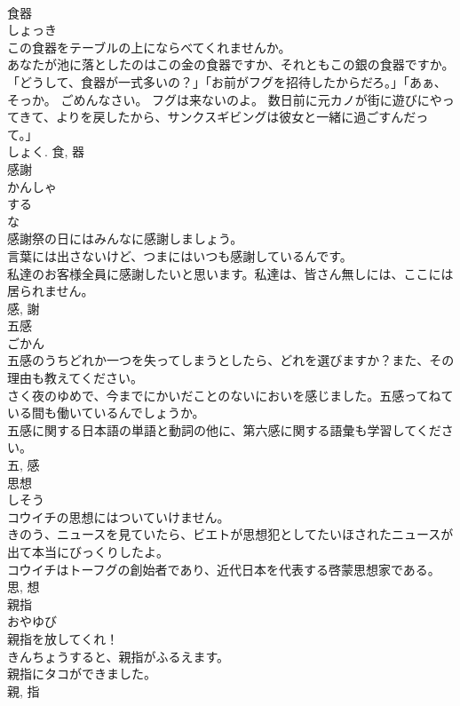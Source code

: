 \documentclass[8pt]{extreport}
\begin{document}
\begin{CJK}{UTF8}{min}
\\	食器	
\\	しょっき	
\\	この食器をテーブルの上にならべてくれませんか。	
\\	あなたが池に落としたのはこの金の食器ですか、それともこの銀の食器ですか。	
\\	「どうして、食器が一式多いの？」「お前がフグを招待したからだろ。」「あぁ、そっか。 ごめんなさい。 フグは来ないのよ。 数日前に元カノが街に遊びにやってきて、よりを戻したから、サンクスギビングは彼女と一緒に過ごすんだって。」	
\\	しょく.	食, 器	
\\	感謝	
\\	かんしゃ	
\\	する 
\\	な 
\\	感謝祭の日にはみんなに感謝しましょう。	
\\	言葉には出さないけど、つまにはいつも感謝しているんです。	
\\	私達のお客様全員に感謝したいと思います。私達は、皆さん無しには、ここには居られません。	
\\	感, 謝	
\\	五感	
\\	ごかん	
\\	五感のうちどれか一つを失ってしまうとしたら、どれを選びますか？また、その理由も教えてください。	
\\	さく夜のゆめで、今までにかいだことのないにおいを感じました。五感ってねている間も働いているんでしょうか。	
\\	五感に関する日本語の単語と動詞の他に、第六感に関する語彙も学習してください。	
\\	五, 感	
\\	思想	
\\	しそう	
\\	コウイチの思想にはついていけません。	
\\	きのう、ニュースを見ていたら、ビエトが思想犯としてたいほされたニュースが出て本当にびっくりしたよ。	
\\	コウイチはトーフグの創始者であり、近代日本を代表する啓蒙思想家である。	
\\	思, 想	
\\	親指	
\\	おやゆび	
\\	親指を放してくれ！	
\\	きんちょうすると、親指がふるえます。	
\\	親指にタコができました。	
\\	親, 指	

\end{CJK}
\end{document}
